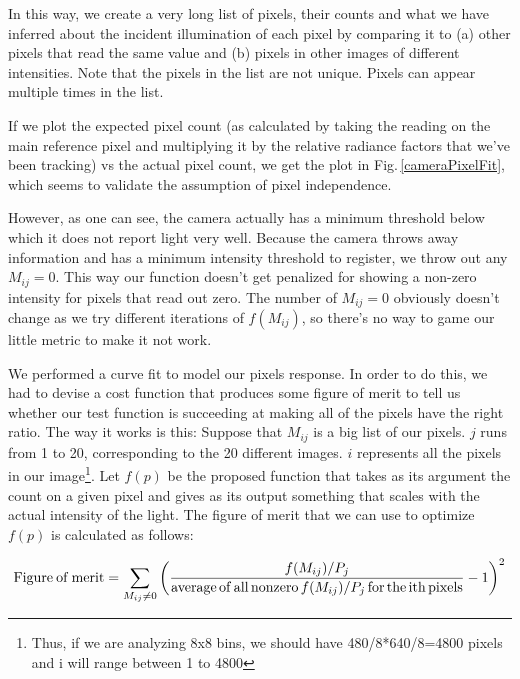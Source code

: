 In this way, we create a very long list of pixels, their counts and what we have inferred about the incident illumination of each pixel by comparing it to (a) other pixels that read the same value and (b) pixels in other images of different intensities. Note that the pixels in the list are not unique. Pixels can appear multiple times in the list.

If we plot the expected pixel count (as calculated by taking the reading on the main reference pixel and multiplying it by the relative radiance factors that we've been tracking) vs the actual pixel count, we get the plot in Fig.\,\ref{cameraPixelFit}, which seems to validate the assumption of pixel independence.

However, as one can see, the camera actually has a minimum threshold below which it does not report light very well. Because the camera throws away information and has a minimum intensity threshold to register, we throw out any $M_{i j}=0$. This way our function doesn't get penalized for showing a non-zero intensity for pixels that read out zero. The number of $M_{i j}=0$ obviously doesn't change as we try different iterations of $f(M_{ij})$, so there's no way to game our little metric to make it not work.

We performed a curve fit to model our pixels response. In order to do this, we had to devise a cost function that produces some figure of merit to tell us whether our test function is succeeding at making all of the pixels have the right ratio. The way it works is this: Suppose that $M_{i j}$ is a big list of our pixels. $j$ runs from 1 to 20, corresponding to the 20 different images. $i$ represents all the pixels in our image\footnote{Thus, if we are analyzing 8x8 bins, we should have 480/8*640/8=4800 pixels and i will range between 1 to 4800}. Let $f(p)$ be the proposed function that takes as its argument the count on a given pixel and gives as its output something that scales with the actual intensity of the light. The figure of merit that we can use to optimize $f(p)$ is calculated as follows: 

\begin{equation}\label{fom}
{\rm Figure\:of\:merit}=\sum_{ M_{i j}\neq 0}\left(\frac{f(M_{i j})/P_j}{{\rm average\,of\,all\,nonzero\,} f(M_{i j})/P_j {\rm \,for\,the\,ith\,pixels}}-1\right)^2
\end{equation}

